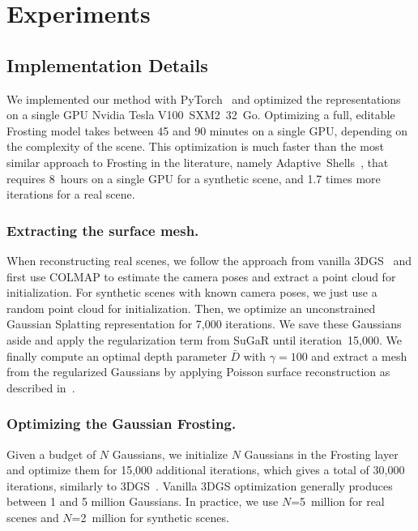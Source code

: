 \section{Experiments}



\subsection{Implementation Details}


We implemented our method with PyTorch~\cite{paszke-nips19-pytorch} and optimized the representations on a single GPU Nvidia Tesla V100~SXM2~32~Go.
Optimizing a full, editable Frosting model takes between 45 and 90 minutes on a single GPU, depending on the complexity of the scene. This optimization is much faster than the most similar approach to Frosting in the literature, namely Adaptive~Shells~\cite{wang-siggraphasia2023-adaptive-shells}, that requires 8~hours on a single GPU for a synthetic scene, and 1.7 times more iterations for a real scene.

\subsubsection{Extracting the surface mesh.} When reconstructing real scenes, we follow the approach from vanilla 3DGS~\cite{kerbl3Dgaussians} and first use COLMAP to estimate the camera poses and extract a  point cloud for initialization. For synthetic scenes with known camera poses, we just use a random point cloud for initialization. Then, we optimize an unconstrained Gaussian Splatting representation for 7,000 iterations. We save these Gaussians aside and apply the regularization term from SuGaR until iteration~15,000. We finally compute an optimal depth parameter $\bar{D}$ with $\gamma=100$ and extract a mesh from the regularized Gaussians by applying Poisson surface reconstruction as described in~\cite{guedon2023sugar}.

\subsubsection{Optimizing the Gaussian Frosting.} Given a budget of $N$ Gaussians, we initialize $N$ Gaussians in the Frosting layer and optimize them for 15,000 additional iterations, which gives a total of 30,000 iterations, similarly to 3DGS~\cite{kerbl3Dgaussians}. Vanilla 3DGS optimization generally produces between 1 and 5 million Gaussians. In practice, we use $N$=5~million for real scenes and $N$=2~million for synthetic scenes.


